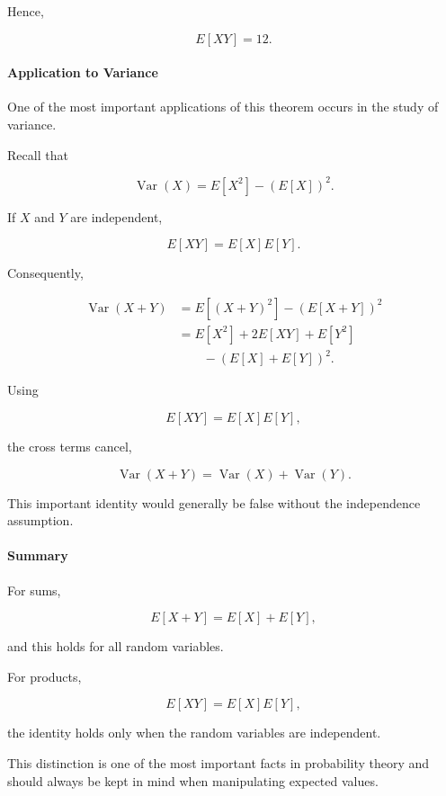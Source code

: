 \documentclass[11pt]{article}
\begin{document}
\begin{mdframed}[
		linewidth=0.8pt,
		roundcorner=6pt,
		backgroundcolor=gray!5,
		linecolor=gray!60,
		innertopmargin=10pt,
		innerbottommargin=10pt,
		innerleftmargin=10pt,
		innerrightmargin=10pt
		]
		Hence,
		
		\[
		\boxed{
			E[XY]=12.
		}
		\]
		
		\bigskip
		
		\paragraph{Application to Variance}
		
		One of the most important applications of this theorem occurs in the study
		of variance.
		
		Recall that
		
		\[
		\operatorname{Var}(X)
		=
		E[X^2]-(E[X])^2.
		\]
		
		If \(X\) and \(Y\) are independent,
		
		\[
		E[XY]
		=
		E[X]E[Y].
		\]
		
		Consequently,
		
		\[
		\begin{aligned}
			\operatorname{Var}(X+Y)
			&=
			E[(X+Y)^2]
			-
			(E[X+Y])^2
			\\[0.3cm]
			&=
			E[X^2]
			+
			2E[XY]
			+
			E[Y^2]
			\\
			&\qquad
			-
			(E[X]+E[Y])^2.
		\end{aligned}
		\]
		
		Using
		
		\[
		E[XY]=E[X]E[Y],
		\]
		
		the cross terms cancel,
		
		\[
		\boxed{
			\operatorname{Var}(X+Y)
			=
			\operatorname{Var}(X)
			+
			\operatorname{Var}(Y).
		}
		\]
		
		This important identity would generally be false without the independence
		assumption.
		
		\bigskip
		
		\paragraph{Summary}
		
		For sums,
		
		\[
		\boxed{
			E[X+Y]
			=
			E[X]
			+
			E[Y],
		}
		\]
		
		and this holds for all random variables.
		
		For products,
		
		\[
		\boxed{
			E[XY]
			=
			E[X]E[Y],
		}
		\]
		
		the identity holds only when the random variables are independent.
		
		This distinction is one of the most important facts in probability theory
		and should always be kept in mind when manipulating expected values.
		
	\end{mdframed}
	
\end{document}
